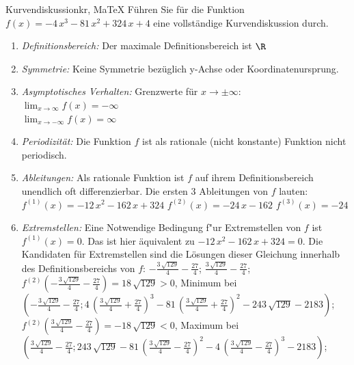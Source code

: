  \providecommand{\MoIl}{(} 
 \providecommand{\MoIr}{)}
 \providecommand{\MIntvlSep}{;} 
 \providecommand{\MElSetSep}{;} 
 \begin{MAufgabe}{Kurvendiskussion}{kr, MaTeX}
 F\"uhren Sie f\"ur die Funktion $f(x)= - 4\, x^3 - 81\, x^2 + 324\, x + 4$ eine vollst\"andige Kurvendiskussion durch.\\ 
 \ifLsg\Loesung
 \begin{enumerate}
 \item \emph{Definitionsbereich:} 
 Der maximale Definitionsbereich ist $\R$\item \emph{Symmetrie:} 
 Keine Symmetrie bez\"uglich y-Achse oder Koordinatenursprung.\item \emph{Asymptotisches Verhalten:} 
 Grenzwerte f\"ur $x\rightarrow \pm \infty$: \\ 
 $\lim_{x\rightarrow \infty} f(x)=- \infty$ \\ 
 $\lim_{x\rightarrow -\infty} f(x)=\infty$ \\ 
 \item \emph{Periodizit\"at:} 
 Die Funktion $f$ ist als rationale (nicht konstante) Funktion nicht periodisch.\item \emph{Ableitungen:} 
 Als rationale Funktion ist $f$ auf ihrem Definitionsbereich unendlich oft differenzierbar. 
 Die ersten 3 Ableitungen von $f$ lauten: \\ 
 $f^{(1)}(x)= - 12\, x^2 - 162\, x + 324$\newline 
  $f^{(2)}(x)= - 24\, x - 162$\newline 
  $f^{(3)}(x)=-24$\newline 
  \item \emph{Extremstellen:} 
 Eine Notwendige Bedingung f"ur Extremstellen von $f$ ist $f^{(1)}(x)=0$. 
 Das ist hier \"aquivalent zu $ - 12\, x^2 - 162\, x + 324=0$. 
 Die Kandidaten f\"ur Extremstellen sind die L\"osungen dieser Gleichung innerhalb des Definitionsbereichs von $f$: $ - \frac{3\, \sqrt{129}}{4} - \frac{27}{4}$; $\frac{3\, \sqrt{129}}{4} - \frac{27}{4}$; \\ 
 $f^{(2)}( - \frac{3\, \sqrt{129}}{4} - \frac{27}{4})=18\, \sqrt{129}$$>0$, Minimum bei $( - \frac{3\, \sqrt{129}}{4} - \frac{27}{4};4\, {\left(\frac{3\, \sqrt{129}}{4} + \frac{27}{4}\right)}^3 - 81\, {\left(\frac{3\, \sqrt{129}}{4} + \frac{27}{4}\right)}^2 - 243\, \sqrt{129} - 2183)$; \\ 
 $f^{(2)}(\frac{3\, \sqrt{129}}{4} - \frac{27}{4})=- 18\, \sqrt{129}$$<0$, Maximum bei $(\frac{3\, \sqrt{129}}{4} - \frac{27}{4};243\, \sqrt{129} - 81\, {\left(\frac{3\, \sqrt{129}}{4} - \frac{27}{4}\right)}^2 - 4\, {\left(\frac{3\, \sqrt{129}}{4} - \frac{27}{4}\right)}^3 - 2183)$; \\ 

\end{enumerate}
\end{MAufgabe}
